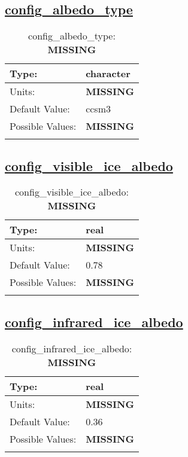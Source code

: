 \subsection[config\_albedo\_type]{\hyperref[sec:nm_tab_shortwave]{config\_albedo\_type}}
\label{subsec:nm_sec_config_albedo_type}
\begin{center}
\begin{longtable}{| p{2.0in} || p{4.0in} |}
    \hline
    Type: & character \\
    \hline
    Units: & {\bf \color{red} MISSING} \\
    \hline
    Default Value: & ccsm3 \\
    \hline
    Possible Values: & {\bf \color{red} MISSING} \\
    \hline
    \caption{config\_albedo\_type: {\bf \color{red} MISSING}}
\end{longtable}
\end{center}
\subsection[config\_visible\_ice\_albedo]{\hyperref[sec:nm_tab_shortwave]{config\_visible\_ice\_albedo}}
\label{subsec:nm_sec_config_visible_ice_albedo}
\begin{center}
\begin{longtable}{| p{2.0in} || p{4.0in} |}
    \hline
    Type: & real \\
    \hline
    Units: & {\bf \color{red} MISSING} \\
    \hline
    Default Value: & 0.78 \\
    \hline
    Possible Values: & {\bf \color{red} MISSING} \\
    \hline
    \caption{config\_visible\_ice\_albedo: {\bf \color{red} MISSING}}
\end{longtable}
\end{center}
\subsection[config\_infrared\_ice\_albedo]{\hyperref[sec:nm_tab_shortwave]{config\_infrared\_ice\_albedo}}
\label{subsec:nm_sec_config_infrared_ice_albedo}
\begin{center}
\begin{longtable}{| p{2.0in} || p{4.0in} |}
    \hline
    Type: & real \\
    \hline
    Units: & {\bf \color{red} MISSING} \\
    \hline
    Default Value: & 0.36 \\
    \hline
    Possible Values: & {\bf \color{red} MISSING} \\
    \hline
    \caption{config\_infrared\_ice\_albedo: {\bf \color{red} MISSING}}
\end{longtable}
\end{center}
